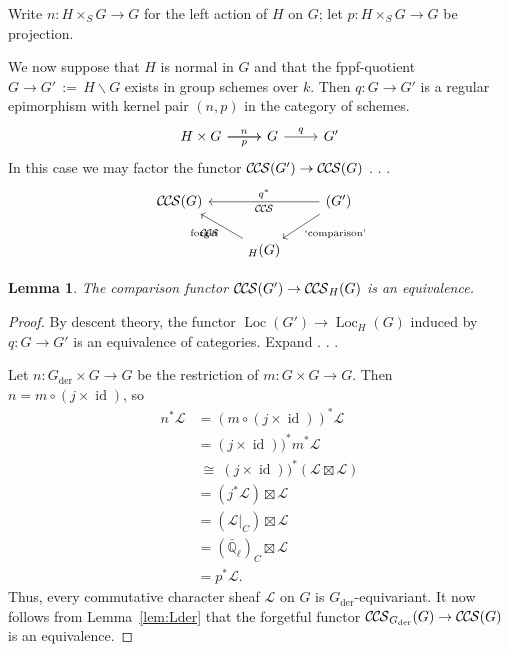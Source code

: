 \documentclass[10pt]{amsart}
\theoremstyle{plain}
\newtheorem{lemma}[theorem]{Lemma}
\theoremstyle{definition}
\newcommand{\EE}{\mathbb{\bar Q}_\ell}
\newcommand{\Fq}{k}
\DeclareMathOperator{\id}{id}
\DeclareMathOperator{\Loc}{Loc}
\newcommand{\der}{_{\operatorname{der}}}
\newcommand{\ab}{_{\operatorname{ab}}}
\newcommand{\ceq}{{\, :=\, }}
\newcommand{\iso}{{\ \cong\ }}
\newcommand{\cs}[1]{{\mathcal{#1}}}
\newcommand{\CCS}{{\mathcal{C\hskip-.8pt C\hskip-0.8pt S}}}
\begin{document}
Write $n : H \times_S G \to G$ for the left action of $H$ on $G$; let $p : H\times_S G \to G$ be projection.


We now suppose that $H$ is normal in $G$ and that the fppf-quotient $G \to G'\ceq H\backslash G$ exists in group schemes over $\Fq$.
Then $q : G \to G'$ is a regular epimorphism with kernel pair $(n,p)$ in the category of schemes.
\[
\begin{tikzcd}
H\times G
 \arrow{r}[shift left]{n}
  \arrow{r}[shift right,swap]{p}
&
G 
\arrow{r}{q}
& 
G'
\end{tikzcd}
\]
In this case we may factor the functor $\CCS(G') \to \CCS(G)$  . . . 
\[
\begin{tikzcd}
\CCS(G) &&\arrow{ll}[swap]{q^*} 
\CCS(G') \arrow{dl}{\text{`comparison'}}\\
& \arrow{ul}{\text{forget}} \CCS_{H}(G) & 
\end{tikzcd}
\]

\begin{lemma}\label{lem:descent}
The comparison functor $\CCS(G') \to \CCS_{H}(G)$ is an equivalence.
\end{lemma}  
  
\begin{proof}
By descent theory, the functor $\Loc(G') \to \Loc_H(G)$ induced by $q: G \to G'$ is an equivalence of categories. Expand . . . 

Let $n : G\der \times G \to G$ be the restriction of $m: G\times G \to G$.
Then $n = m \circ (j \times \id)$, so
\begin{align*}
n^* \cs{L} 
&= (m \circ (j \times \id))^* \cs{L}\\
&= (j \times \id))^* m^*\cs{L}\\
&\iso (j \times \id))^* (\cs{L} \boxtimes \cs{L})\\
&= (j^*\cs{L}) \boxtimes \cs{L}\\
&= (\cs{L}\vert_C) \boxtimes \cs{L}\\
&= (\EE)_C \boxtimes \cs{L}\\
&= p^* \cs{L}.
\end{align*}
Thus, every commutative character sheaf $\cs{L}$ on $G$ is $G\der$-equivariant.
It now follows from Lemma~\ref{lem:Lder} that the forgetful functor $\CCS_{G\der}(G) \to \CCS(G)$ is an equivalence. 
\end{proof}
\end{document}
